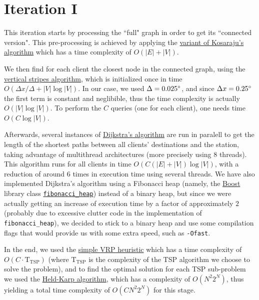 \section{Iteration I} \label{iterations-1}
This iteration starts by processing the ``full" graph in order to get its ``connected version". This pre-processing is achieved by applying the \hyperref[algorithm-scc-kosaraju-v]{variant of Kosaraju's algorithm} which has a time complexity of $O(|E| + |V|)$.\par
We then find for each client the closest node in the connected graph, using the \hyperref[algorithm-vstripes]{vertical stripes algorithm}, which is initialized once in time $O(\Delta x / \Delta + |V| \log |V|)$. In our case, we used $\Delta = 0.025^{\circ}$, and since $\Delta x = 0.25^{\circ}$ the first term is constant and neglibible, thus the time complexity is actually $O(|V| \log |V|)$. To perform the $C$ queries (one for each client), one needs time $O(C \log |V|)$.\par
Afterwards, several instances of \hyperref[algorithm-shortestpath-dijkstra]{Dijkstra's algorithm} are run in paralell to get the length of the shortest paths between all clients' destinations and the station, taking advantage of multithread architectures (more precisely using 8 threads). This algorithm runs for all clients in time $O(C(|E|+|V|) \log |V|)$, with a reduction of around 6 times in execution time using several threads. We have also implemented Dijkstra's algorithm using a Fibonacci heap (namely, the \href{https://www.boost.org/}{Boost} library class \href{https://www.boost.org/doc/libs/1_49_0/doc/html/boost/heap/fibonacci_heap.html}{\texttt{fibonacci\_heap}}) instead of a binary heap, but since we were actually getting an increase of execution time by a factor of approximately $2$ (probably due to excessive clutter code in the implementation of \texttt{fibonacci\_heap}), we decided to stick to a binary heap and use some compilation flags that would provide us with some extra speed, such as \texttt{-Ofast}.
\par
In the end, we used the \hyperref[algorithm-vrp-heuristic]{simple \acrshort*{VRP} heuristic} which has a time complexity of $O(C \cdot \text{T}_\text{TSP})$ (where $\text{T}_\text{TSP}$ is the complexity of the \acrshort{TSP} algorithm we choose to solve the problem), and to find the optimal solution for each \acrshort{TSP} sub-problem we used the \hyperref[algorithm-tsp-heldkarp]{Held-Karp algorithm}, which has a complexity of $O(N^2 2^N)$, thus yielding a total time complexity of $O(C N^2 2^N)$ for this stage.\par

